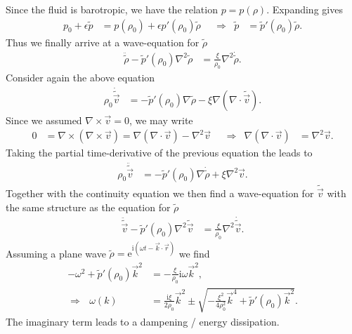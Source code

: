 \documentclass[english, parskip=full]{scrartcl}
\newcommand{\kla}{}
\renewcommand{\i}{\text{i}}
\newcommand{\e}{\text{e}}
\begin{document}
Since the fluid is barotropic, we have the relation $p=p(\rho)$.
Expanding gives
\begin{align}
p_0 + \epsilon\tilde{p} &= p(\rho_0) + \epsilon p'(\rho_0)\tilde{\rho} &&\Rightarrow & \tilde{p} &= \tilde{p}'(\rho_0)\tilde{\rho}.
\end{align}
Thus we finally arrive at a wave-equation for $\tilde{\rho}$
\begin{align}
\ddot{\tilde{\rho}} -\tilde{p}'(\rho_0)\nabla^2\tilde{\rho} &= \frac{\xi}{\rho_0}\nabla^2\dot{\tilde{\rho}}.
\end{align}
Consider again the above equation 
\begin{align}
\rho_0\dot{\tilde{\vec{v}}} &= -\tilde{p}'(\rho_0)\nabla\tilde{\rho} - \xi\nabla\kla\left( \nabla\cdot\tilde{\vec{v}} \right).
\end{align}
Since we assumed $\nabla\times\vec{v} = 0$, we may write
\begin{align}
0 &= \nabla\times\kla\left( \nabla\times\vec{v} \right) = \nabla\kla\left( \nabla\cdot\vec{v} \right) - \nabla^2\vec{v} && \Rightarrow & \nabla \kla\left( \nabla\cdot\vec{v} \right) &= \nabla^2\vec{v}.
\end{align}
Taking the partial time-derivative of the previous equation the leads to 
\begin{align}
\rho_0\ddot{\tilde{\vec{v}}} &= -\tilde{p}'(\rho_0)\nabla\dot{\tilde{\rho}} + \xi\nabla^2\vec{v}.
\end{align}
Together with the continuity equation we then find a wave-equation for $\tilde{\vec{v}}$ with the same structure as the equation for $\tilde{\rho}$
\begin{align}
\ddot{\tilde{\vec{v}}} -\tilde{p}'(\rho_0)\nabla^2\tilde{\vec{v}} &= \frac{\xi}{\rho_0}\nabla^2\dot{\tilde{\vec{v}}}.
\end{align}
Assuming a plane wave $\tilde{\rho} = \e^{\i(\omega t - \vec{k}\cdot\vec{r})}$ we find
\begin{align}
-\omega^2 + \tilde{p}'(\rho_0)\vec{k}^2 &= -\frac{\xi}{\rho_0}\i\omega\vec{k}^2,\\
\Rightarrow\ \ \ \omega(k) &= \frac{\i\xi}{2\rho_0}\vec{k}^2 \pm \sqrt{-\frac{\xi^2}{4\rho_0^2}\vec{k}^4 + \tilde{p}'(\rho_0)\vec{k}^2}.
\end{align}
The imaginary term leads to a dampening / energy dissipation.

\end{document}
